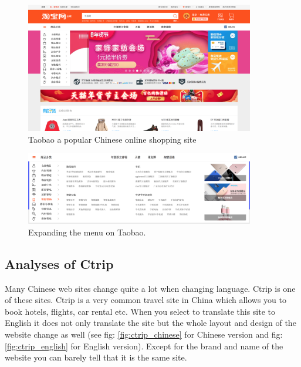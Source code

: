 \begin{figure}[h]
\centering
\includegraphics[width=100mm]{Images/Taobao}
\decoRule
\caption[Taobao]{Taobao a popular Chinese online shopping site}
\label{fig:taobao}
\end{figure}

\begin{figure}[h]
\centering
\includegraphics[width=100mm]{Images/Taobao_menu}
\decoRule
\caption[Taobao' menu bar]{Expanding the menu on Taobao.}
\label{fig:taobao_menu}
\end{figure}

\subsection{Analyses of Ctrip}
Many Chinese web sites change quite a lot when changing language. Ctrip is one of these sites. Ctrip is a very common travel site in China which allows you to book hotels, flights, car rental etc. When you select to translate this site to English it does not only translate the site but the whole layout and design of the website change as well (see  fig: \ref{fig:ctrip_chinese} for Chinese version and fig: \ref{fig:ctrip_english} for English version). Except for the brand and name of the website you can barely tell that it is the same site.

